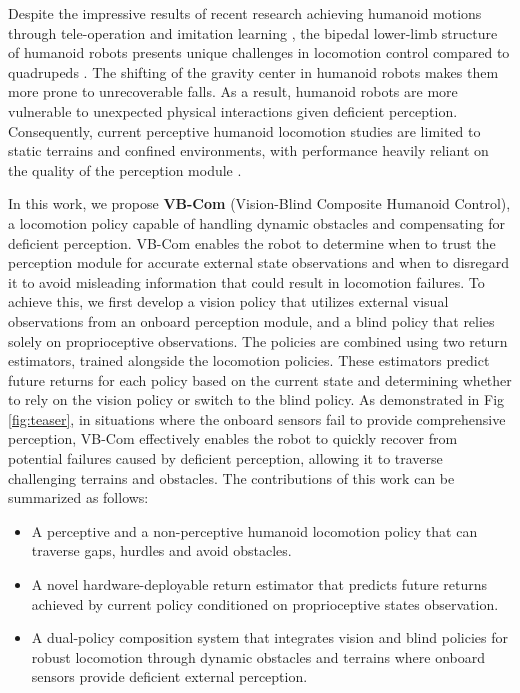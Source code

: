 Despite the impressive results of recent research achieving humanoid motions through tele-operation and imitation learning \cite{cheng2024expressive, ji2024exbody2, lu2024mobile, he2024hover, fu2024humanplus, he2024omnih2o}, the bipedal lower-limb structure of humanoid robots presents unique challenges in locomotion control compared to quadrupeds \cite{gu2024advancing, radosavovic2024learning}. The shifting of the gravity center in humanoid robots makes them more prone to unrecoverable falls. As a result, humanoid robots are more vulnerable to unexpected physical interactions given deficient perception. Consequently, current perceptive humanoid locomotion studies are limited to static terrains and confined environments, with performance heavily reliant on the quality of the perception module \cite{long2024learning, zhuang2024humanoid}.

In this work, we propose \textbf{VB-Com} (Vision-Blind Composite Humanoid Control), a locomotion policy capable of handling dynamic obstacles and compensating for deficient perception. VB-Com enables the robot to determine when to trust the perception module for accurate external state observations and when to disregard it to avoid misleading information that could result in locomotion failures. To achieve this, we first develop a vision policy that utilizes external visual observations from an onboard perception module, and a blind policy that relies solely on proprioceptive observations. The policies are combined using two return estimators, trained alongside the locomotion policies. These estimators predict future returns for each policy based on the current state and determining whether to rely on the vision policy or switch to the blind policy. As demonstrated in Fig \ref{fig:teaser}, in situations where the onboard sensors fail to provide comprehensive perception, VB-Com effectively enables the robot to quickly recover from potential failures caused by deficient perception, allowing it to traverse challenging terrains and obstacles. The contributions of this work can be summarized as follows:

\begin{itemize}
    \item A perceptive and a non-perceptive humanoid locomotion policy that can traverse gaps, hurdles and avoid obstacles.
    \item A novel hardware-deployable return estimator that predicts future returns achieved by current policy conditioned on proprioceptive states observation.
    \item A dual-policy composition system that integrates vision and blind policies for robust locomotion through dynamic obstacles and terrains where onboard sensors provide deficient external perception.
\end{itemize}
